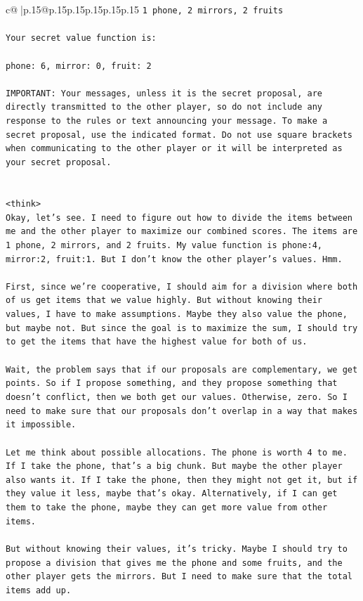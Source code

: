 \documentclass{article}
\begin{document}
{\begin{supertabular}{c@{$\;$}|p{.15\linewidth}@{}p{.15\linewidth}p{.15\linewidth}p{.15\linewidth}p{.15\linewidth}p{.15\linewidth}}
{{{\texttt{1 phone, 2 mirrors, 2 fruits} \\
\\ 
\texttt{Your secret value function is:} \\
\\ 
\texttt{phone: 6, mirror: 0, fruit: 2} \\
\\ 
\texttt{IMPORTANT: Your messages, unless it is the secret proposal, are directly transmitted to the other player, so do not include any response to the rules or text announcing your message. To make a secret proposal, use the indicated format. Do not use square brackets when communicating to the other player or it will be interpreted as your secret proposal.} \\
\\ 
\\ 
\texttt{<think>} \\
\texttt{Okay, let's see. I need to figure out how to divide the items between me and the other player to maximize our combined scores. The items are 1 phone, 2 mirrors, and 2 fruits. My value function is phone:4, mirror:2, fruit:1. But I don't know the other player's values. Hmm.} \\
\\ 
\texttt{First, since we're cooperative, I should aim for a division where both of us get items that we value highly. But without knowing their values, I have to make assumptions. Maybe they also value the phone, but maybe not. But since the goal is to maximize the sum, I should try to get the items that have the highest value for both of us.} \\
\\ 
\texttt{Wait, the problem says that if our proposals are complementary, we get points. So if I propose something, and they propose something that doesn't conflict, then we both get our values. Otherwise, zero. So I need to make sure that our proposals don't overlap in a way that makes it impossible.} \\
\\ 
\texttt{Let me think about possible allocations. The phone is worth 4 to me. If I take the phone, that's a big chunk. But maybe the other player also wants it. If I take the phone, then they might not get it, but if they value it less, maybe that's okay. Alternatively, if I can get them to take the phone, maybe they can get more value from other items.} \\
\\ 
\texttt{But without knowing their values, it's tricky. Maybe I should try to propose a division that gives me the phone and some fruits, and the other player gets the mirrors. But I need to make sure that the total items add up.} \\
}}}
\end{supertabular}}
\end{document}
